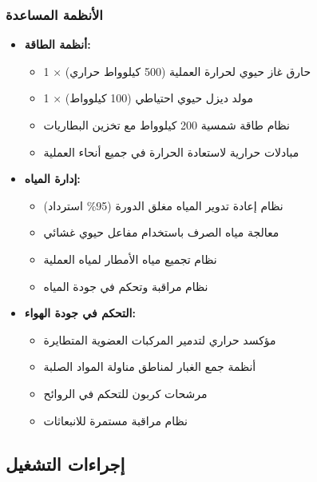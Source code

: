 \subsubsection{الأنظمة المساعدة}
\begin{itemize}
    \item \textbf{أنظمة الطاقة:}
    \begin{itemize}
        \item 1 × حارق غاز حيوي لحرارة العملية (500 كيلوواط حراري)
        \item 1 × مولد ديزل حيوي احتياطي (100 كيلوواط)
        \item نظام طاقة شمسية 200 كيلوواط مع تخزين البطاريات
        \item مبادلات حرارية لاستعادة الحرارة في جميع أنحاء العملية
    \end{itemize}
    
    \item \textbf{إدارة المياه:}
    \begin{itemize}
        \item نظام إعادة تدوير المياه مغلق الدورة (95\% استرداد)
        \item معالجة مياه الصرف باستخدام مفاعل حيوي غشائي
        \item نظام تجميع مياه الأمطار لمياه العملية
        \item نظام مراقبة وتحكم في جودة المياه
    \end{itemize}
    
    \item \textbf{التحكم في جودة الهواء:}
    \begin{itemize}
        \item مؤكسد حراري لتدمير المركبات العضوية المتطايرة
        \item أنظمة جمع الغبار لمناطق مناولة المواد الصلبة
        \item مرشحات كربون للتحكم في الروائح
        \item نظام مراقبة مستمرة للانبعاثات
    \end{itemize}
\end{itemize}

\subsection{إجراءات التشغيل}

